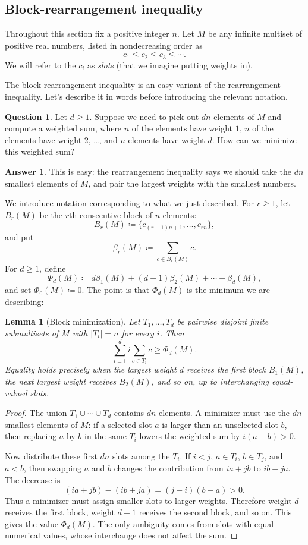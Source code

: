 \documentclass[11pt]{amsart}
\newtheorem{lemma}[theorem]{Lemma}
\theoremstyle{definition}
\newtheorem*{question}{Question}
\newtheorem*{answer}{Answer}
\begin{document}
\subsection{Block-rearrangement inequality}
\label{sec:block}
Throughout this section fix a positive integer $n$.
Let $M$ be any infinite multiset of positive real numbers, listed in nondecreasing order as
\[ c_1\leq c_2\leq c_3\leq\cdots.  \]
We will refer to the $c_i$ as \emph{slots} (that we imagine putting weights in).

The block-rearrangement inequality is an easy variant of the rearrangement inequality.
Let's describe it in words before introducing the relevant notation.
\begin{question}
  Let $d \ge 1$.
  Suppose we need to pick out $dn$ elements of $M$ and compute a weighted sum,
  where $n$ of the elements have weight $1$,
  $n$ of the elements have weight $2$, \dots,
  and $n$ elements have weight $d$.
  How can we minimize this weighted sum?
\end{question}
\begin{answer}
  This is easy:
  the rearrangement inequality says we should take the $dn$ smallest elements of $M$,
  and pair the largest weights with the smallest numbers.
\end{answer}
We introduce notation corresponding to what we just described.
For $r\geq 1$, let $B_r(M)$ be the $r$th consecutive block of $n$ elements:
\[
  B_r(M) \coloneq \{c_{(r-1)n+1},\ldots,c_{rn}\},
\]
and put
\[
  \beta_r(M) \coloneq \sum_{c\in B_r(M)}c.
\]
For $d\geq 1$, define
\[
  \Phi_d(M) \coloneq d\beta_1(M)+(d-1)\beta_2(M)+\cdots+\beta_d(M),
\]
and set $\Phi_0(M) \coloneq 0$.
The point is that $\Phi_d(M)$ is the minimum we are describing:

\begin{lemma}[Block minimization]\label{lem:H2-block-min}
Let $T_1,\ldots,T_d$ be pairwise disjoint finite submultisets of $M$ with $|T_i|=n$ for every $i$.
Then
\[
  \sum_{i=1}^d i\sum_{c\in T_i}c\geq \Phi_d(M).
\]
Equality holds precisely when the largest weight $d$ receives the first block $B_1(M)$,
the next largest weight receives $B_2(M)$, and so on, up to interchanging equal-valued slots.
\end{lemma}

\begin{proof}
The union $T_1\cup\cdots\cup T_d$ contains $dn$ elements.
A minimizer must use the $dn$ smallest elements of $M$:
if a selected slot $a$ is larger than an unselected slot $b$,
then replacing $a$ by $b$ in the same $T_i$ lowers the weighted sum by $i(a-b)>0$.

Now distribute these first $dn$ slots among the $T_i$.
If $i<j$, $a\in T_i$, $b\in T_j$, and $a<b$,
then swapping $a$ and $b$ changes the contribution from $ia+jb$ to $ib+ja$.  The decrease is
\[
  (ia+jb)-(ib+ja)=(j-i)(b-a)>0.
\]
Thus a minimizer must assign smaller slots to larger weights.
Therefore weight $d$ receives the first block, weight $d-1$ receives the second block, and so on.
This gives the value $\Phi_d(M)$.
The only ambiguity comes from slots with equal numerical values, whose interchange does not affect the sum.
\end{proof}
\end{document}
